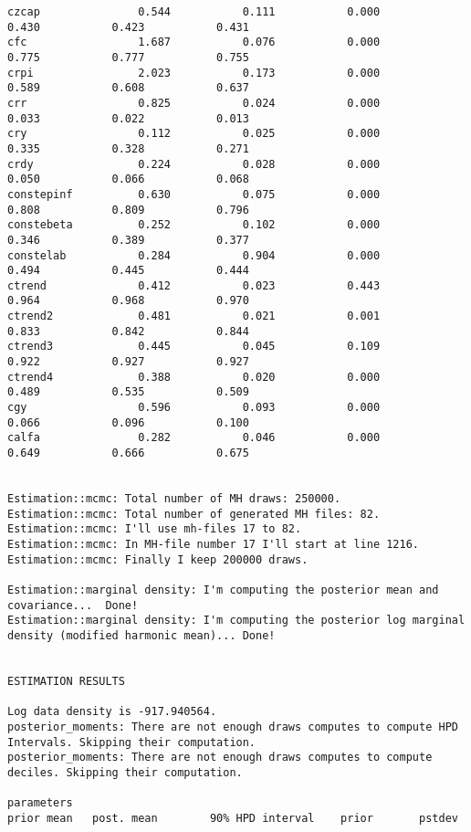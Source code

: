 \documentclass[]{article}
\begin{document}
\begin{verbatim}
czcap      	        0.544 	        0.111 	        0.000	        0.430	        0.423	        0.431
cfc        	        1.687 	        0.076 	        0.000	        0.775	        0.777	        0.755
crpi       	        2.023 	        0.173 	        0.000	        0.589	        0.608	        0.637
crr        	        0.825 	        0.024 	        0.000	        0.033	        0.022	        0.013
cry        	        0.112 	        0.025 	        0.000	        0.335	        0.328	        0.271
crdy       	        0.224 	        0.028 	        0.000	        0.050	        0.066	        0.068
constepinf 	        0.630 	        0.075 	        0.000	        0.808	        0.809	        0.796
constebeta 	        0.252 	        0.102 	        0.000	        0.346	        0.389	        0.377
constelab  	        0.284 	        0.904 	        0.000	        0.494	        0.445	        0.444
ctrend     	        0.412 	        0.023 	        0.443	        0.964	        0.968	        0.970
ctrend2    	        0.481 	        0.021 	        0.001	        0.833	        0.842	        0.844
ctrend3    	        0.445 	        0.045 	        0.109	        0.922	        0.927	        0.927
ctrend4    	        0.388 	        0.020 	        0.000	        0.489	        0.535	        0.509
cgy        	        0.596 	        0.093 	        0.000	        0.066	        0.096	        0.100
calfa      	        0.282 	        0.046 	        0.000	        0.649	        0.666	        0.675


Estimation::mcmc: Total number of MH draws: 250000.
Estimation::mcmc: Total number of generated MH files: 82.
Estimation::mcmc: I'll use mh-files 17 to 82.
Estimation::mcmc: In MH-file number 17 I'll start at line 1216.
Estimation::mcmc: Finally I keep 200000 draws.

Estimation::marginal density: I'm computing the posterior mean and covariance...  Done!
Estimation::marginal density: I'm computing the posterior log marginal density (modified harmonic mean)... Done!


ESTIMATION RESULTS

Log data density is -917.940564.
posterior_moments: There are not enough draws computes to compute HPD Intervals. Skipping their computation.
posterior_moments: There are not enough draws computes to compute deciles. Skipping their computation.

parameters
prior mean   post. mean        90% HPD interval    prior       pstdev


\end{verbatim}
\end{document}
